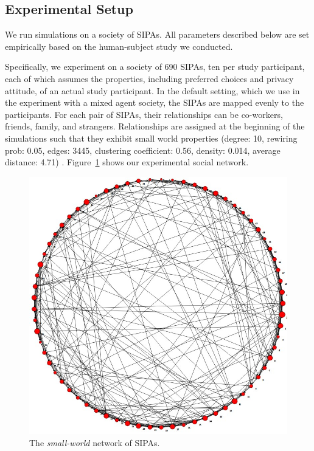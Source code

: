 \subsection{Experimental Setup}


We run simulations on a society of \locationapp SIPAs. All parameters described below are set empirically based on the human-subject study we conducted.

Specifically, we experiment on a society of 690 SIPAs, ten per study participant, each of which assumes the properties, including preferred choices and privacy attitude, of an actual study participant. In the default setting, which we use in the experiment with a mixed agent society, the SIPAs are mapped evenly to the participants. For each pair of SIPAs, their relationships can be co-workers, friends, family, and strangers.
Relationships are assigned at the beginning of the simulations such that they exhibit small world properties 
(degree: 10, rewiring prob: 0.05, edges: 3445, clustering coefficient: 0.56, density: 0.014, average distance: 4.71) 
\citep{Watts+Strogatz-98}. Figure~\ref{fig:smallworld-69d10p50} shows our experimental social network.

\begin{figure}[!htb]
    \centering
    \includegraphics[width=0.6\columnwidth]{./Chapter-4/fig/smallworld-69d10p50.jpg}
    \caption[The \emph{small-world} network of SIPAs]{The \emph{small-world} network of SIPAs.}
    \label{fig:smallworld-69d10p50}
\end{figure}


